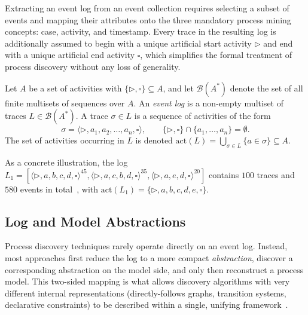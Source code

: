Extracting an event log from an event collection requires selecting a
subset of events and mapping their attributes onto the three mandatory
process mining concepts: case, activity, and timestamp. Every trace in the
resulting log is additionally assumed to begin with a unique artificial
start activity $\triangleright$ and end with a unique artificial end
activity $\square$, which simplifies the formal treatment of process
discovery without any loss of generality.

\begin{definition}
	\label{def:event-log}
	Let $A$ be a set of activities with $\{\triangleright, \square\} \subseteq A$,
	and let $\mathcal{B}(A^{*})$ denote the set of all finite multisets of
	sequences over $A$. An \emph{event log} is a non-empty multiset of traces
	$L \in \mathcal{B}(A^{*})$. A trace $\sigma \in L$ is a sequence of
	activities of the form
	\[
	\sigma = \langle \triangleright, a_1, a_2, \dots, a_n, \square \rangle,
	\qquad \{\triangleright, \square\} \cap \{a_1, \dots, a_n\} = \emptyset.
	\]
	The set of activities occurring in $L$ is denoted
	$\mathrm{act}(L) = \bigcup_{\sigma \in L} \{a \in \sigma\} \subseteq A$.
\end{definition}

As a concrete illustration, the log
$L_1 = [\langle \triangleright, a, b, c, d, \square \rangle^{45},
\langle \triangleright, a, c, b, d, \square \rangle^{35},
\langle \triangleright, a, e, d, \square \rangle^{20}]$
contains $100$ traces and $580$ events in
total~\cite{aalst2018reconstruction}, with
$\mathrm{act}(L_1) = \{\triangleright, a, b, c, d, e, \square\}$.

\subsection{Log and Model Abstractions}
\label{subsec:abstractions}

Process discovery techniques rarely operate directly on an event log.
Instead, most approaches first reduce the log to a more compact
\emph{abstraction}, discover a corresponding abstraction on the model side,
and only then reconstruct a process model. This two-sided mapping is what
allows discovery algorithms with very different internal representations
(directly-follows graphs, transition systems, declarative constraints) to be
described within a single, unifying framework~\cite{aalst2018reconstruction}.

